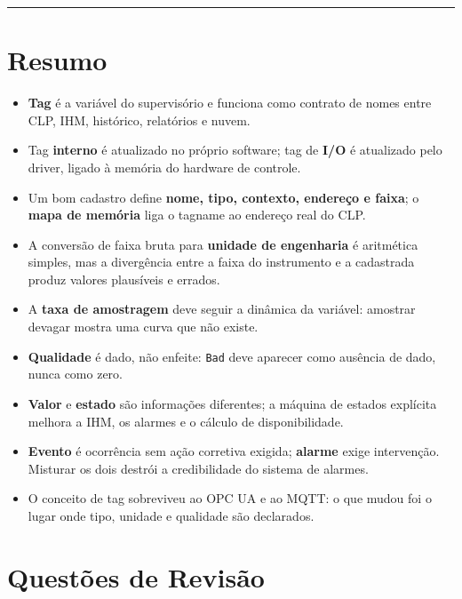 \begin{center}\rule{0.5\linewidth}{0.5pt}\end{center}

\section{Resumo}\label{resumo}

\begin{itemize}
\tightlist
\item
  \textbf{Tag} é a variável do supervisório e funciona como contrato de nomes entre CLP, IHM, histórico, relatórios e nuvem.
\item
  Tag \textbf{interno} é atualizado no próprio software; tag de \textbf{I/O} é atualizado pelo driver, ligado à memória do hardware de controle.
\item
  Um bom cadastro define \textbf{nome, tipo, contexto, endereço e faixa}; o \textbf{mapa de memória} liga o tagname ao endereço real do CLP.
\item
  A conversão de faixa bruta para \textbf{unidade de engenharia} é aritmética simples, mas a divergência entre a faixa do instrumento e a cadastrada produz valores plausíveis e errados.
\item
  A \textbf{taxa de amostragem} deve seguir a dinâmica da variável: amostrar devagar mostra uma curva que não existe.
\item
  \textbf{Qualidade} é dado, não enfeite: \passthrough{\lstinline!Bad!} deve aparecer como ausência de dado, nunca como zero.
\item
  \textbf{Valor} e \textbf{estado} são informações diferentes; a máquina de estados explícita melhora a IHM, os alarmes e o cálculo de disponibilidade.
\item
  \textbf{Evento} é ocorrência sem ação corretiva exigida; \textbf{alarme} exige intervenção. Misturar os dois destrói a credibilidade do sistema de alarmes.
\item
  O conceito de tag sobreviveu ao OPC UA e ao MQTT: o que mudou foi o lugar onde tipo, unidade e qualidade são declarados.
\end{itemize}

\section{Questões de Revisão}\label{questuxf5es-de-revisuxe3o}

